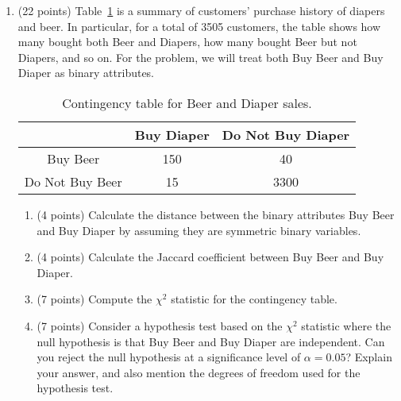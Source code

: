 \documentclass[11pt]{article}
\begin{document}
\begin{enumerate}
\item (22 points) Table~\ref{tab:beerdiaper} is a summary of customers’ purchase history of diapers and beer. In particular, for a total of 3505 customers, the table shows how many bought both Beer and Diapers, how many bought Beer but not Diapers, and so on. For the problem, we will treat both Buy Beer and Buy Diaper as binary attributes.
\begin{table}[h]
    \centering
    \begin{tabular}{|c||c|c|} \hline
             & Buy Diaper & Do Not Buy Diaper \\ \hline \hline 
    Buy Beer  &  150 & 40 \\ 
    Do Not Buy Beer & 15 & 3300 \\ \hline 
    \end{tabular}
    \caption{Contingency table for Beer and Diaper sales.}
    \label{tab:beerdiaper}
\end{table}
\begin{enumerate}
\item (4 points) Calculate the distance between the binary attributes Buy Beer and Buy Diaper by assuming they are symmetric binary variables.
\item (4 points) Calculate the Jaccard coefficient between Buy Beer and Buy Diaper.
\item (7 points) Compute the $\chi^2$ statistic for the contingency table.
\item (7 points) Consider a hypothesis test based on the $\chi^2$ statistic where the null hypothesis is that Buy Beer and Buy Diaper are independent. Can you reject the null hypothesis at a significance level of $\alpha=0.05$? Explain your answer, and also mention the degrees of freedom used for the hypothesis test.
\end{enumerate}


\end{enumerate}
\end{document}
